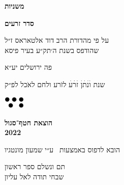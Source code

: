 \documentclass[14pt, a5paper, twoside, extrafontsizes]{memoir}
\begin{document}
\frontmatter
\pagestyle{myheadings}
\thispagestyle{mytitlepage}
\begin{hebrew}
{\Centering  

  {\huge\bfseries משניות}
  
  {\LARGE\bfseries סדר זרעים}

  \vspace{1em}

  \vspace{0.5em}
  על פי מהדורת הרב דוד אלטאראס ז״ל\\שהודפס בשנת ה׳תק״ע בעיר פיסא

    \vspace{8em}
    פה {\LARGE ירושלים} יע״א

    {\small שנת}
    {\Large וׄנׄתׄןׄ זׄרׄעׄ}
    לזֹרע ולחם לאֹכל
    {\small לפ״ק}
    
    \vspace{2em}
  \includegraphics[width=10mm]{hatafSegolLogoNoText.png}\\
  
    \vspace{.5em}
  {
    \bfseries הוצאת חטף־סגול\\2022
    
 {\footnotesize  הובא לדפוס באמצעות \XeLaTeX\ ע״י שמעון מונטגיו}

  }
    
}




\vspace{2em}

\mainmatter
\thispagestyle{empty}















\def \sederCount{ראשון}


{\centering
  \LARGE תם ונשלם ספר ראשון\\שבחי תודה לאל עליון
}

\tractatehead{~}{~} %
\end{hebrew}
\end{document}
